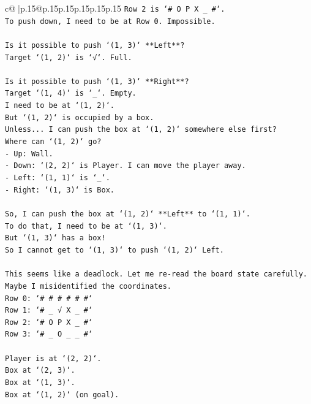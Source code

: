 \documentclass{article}
\begin{document}
{\begin{supertabular}{c@{$\;$}|p{.15\linewidth}@{}p{.15\linewidth}p{.15\linewidth}p{.15\linewidth}p{.15\linewidth}p{.15\linewidth}}
{{{\texttt{Row 2 is `\# O P X \_ \#`.} \\
\texttt{To push down, I need to be at Row 0. Impossible.} \\
\\ 
\texttt{Is it possible to push `(1, 3)` **Left**?} \\
\texttt{Target `(1, 2)` is `√`. Full.} \\
\\ 
\texttt{Is it possible to push `(1, 3)` **Right**?} \\
\texttt{Target `(1, 4)` is `\_`. Empty.} \\
\texttt{I need to be at `(1, 2)`.} \\
\texttt{But `(1, 2)` is occupied by a box.} \\
\texttt{Unless... I can push the box at `(1, 2)` somewhere else first?} \\
\texttt{Where can `(1, 2)` go?} \\
\texttt{{-} Up: Wall.} \\
\texttt{{-} Down: `(2, 2)` is Player. I can move the player away.} \\
\texttt{{-} Left: `(1, 1)` is `\_`.} \\
\texttt{{-} Right: `(1, 3)` is Box.} \\
\\ 
\texttt{So, I can push the box at `(1, 2)` **Left** to `(1, 1)`.} \\
\texttt{To do that, I need to be at `(1, 3)`.} \\
\texttt{But `(1, 3)` has a box!} \\
\texttt{So I cannot get to `(1, 3)` to push `(1, 2)` Left.} \\
\\ 
\texttt{This seems like a deadlock. Let me re{-}read the board state carefully.} \\
\texttt{Maybe I misidentified the coordinates.} \\
\texttt{Row 0: `\# \# \# \# \# \#`} \\
\texttt{Row 1: `\# \_ √ X \_ \#`} \\
\texttt{Row 2: `\# O P X \_ \#`} \\
\texttt{Row 3: `\# \_ O \_ \_ \#`} \\
\\ 
\texttt{Player is at `(2, 2)`.} \\
\texttt{Box at `(2, 3)`.} \\
\texttt{Box at `(1, 3)`.} \\
\texttt{Box at `(1, 2)` (on goal).} \\
}}}
\end{supertabular}}
\end{document}
